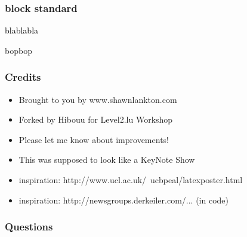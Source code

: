 \documentclass[serif,mathserif]{beamer}
\begin{document}
\begin{frame}
  \frametitle{block standard}
  \begin{block} {\textcolor{black}{blablabla}  }
  \end{block}
  \alert{bopbop}
\end{frame}


\begin{frame}
  \frametitle{Credits}
  \begin{itemize}
  \item Brought to you by www.shawnlankton.com
  \item Forked by Hibouu for Level2.lu Workshop
  \item Please let me know about improvements!
  \item This was supposed to look like a KeyNote Show
  \item inspiration: http://www.ucl.ac.uk/~ucbpeal/latexposter.html
  \item inspiration: http://newsgroups.derkeiler.com/... (in code)
  \end{itemize}
\end{frame}

\begin{frame}
  \frametitle{Questions}
\end{frame}
\end{document}
